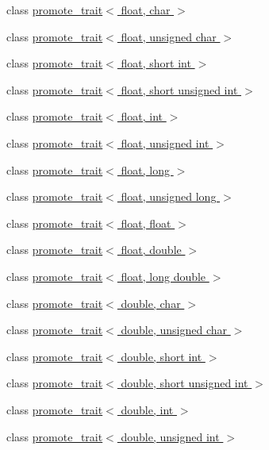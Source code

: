 \begin{DoxyCompactItemize}
class \hyperlink{classpromote__trait_3_01float_00_01char_01_4}{promote\+\_\+trait$<$ float, char $>$}
\item 
class \hyperlink{classpromote__trait_3_01float_00_01unsigned_01char_01_4}{promote\+\_\+trait$<$ float, unsigned char $>$}
\item 
class \hyperlink{classpromote__trait_3_01float_00_01short_01int_01_4}{promote\+\_\+trait$<$ float, short int $>$}
\item 
class \hyperlink{classpromote__trait_3_01float_00_01short_01unsigned_01int_01_4}{promote\+\_\+trait$<$ float, short unsigned int $>$}
\item 
class \hyperlink{classpromote__trait_3_01float_00_01int_01_4}{promote\+\_\+trait$<$ float, int $>$}
\item 
class \hyperlink{classpromote__trait_3_01float_00_01unsigned_01int_01_4}{promote\+\_\+trait$<$ float, unsigned int $>$}
\item 
class \hyperlink{classpromote__trait_3_01float_00_01long_01_4}{promote\+\_\+trait$<$ float, long $>$}
\item 
class \hyperlink{classpromote__trait_3_01float_00_01unsigned_01long_01_4}{promote\+\_\+trait$<$ float, unsigned long $>$}
\item 
class \hyperlink{classpromote__trait_3_01float_00_01float_01_4}{promote\+\_\+trait$<$ float, float $>$}
\item 
class \hyperlink{classpromote__trait_3_01float_00_01double_01_4}{promote\+\_\+trait$<$ float, double $>$}
\item 
class \hyperlink{classpromote__trait_3_01float_00_01long_01double_01_4}{promote\+\_\+trait$<$ float, long double $>$}
\item 
class \hyperlink{classpromote__trait_3_01double_00_01char_01_4}{promote\+\_\+trait$<$ double, char $>$}
\item 
class \hyperlink{classpromote__trait_3_01double_00_01unsigned_01char_01_4}{promote\+\_\+trait$<$ double, unsigned char $>$}
\item 
class \hyperlink{classpromote__trait_3_01double_00_01short_01int_01_4}{promote\+\_\+trait$<$ double, short int $>$}
\item 
class \hyperlink{classpromote__trait_3_01double_00_01short_01unsigned_01int_01_4}{promote\+\_\+trait$<$ double, short unsigned int $>$}
\item 
class \hyperlink{classpromote__trait_3_01double_00_01int_01_4}{promote\+\_\+trait$<$ double, int $>$}
\item 
class \hyperlink{classpromote__trait_3_01double_00_01unsigned_01int_01_4}{promote\+\_\+trait$<$ double, unsigned int $>$}

\end{DoxyCompactItemize}
